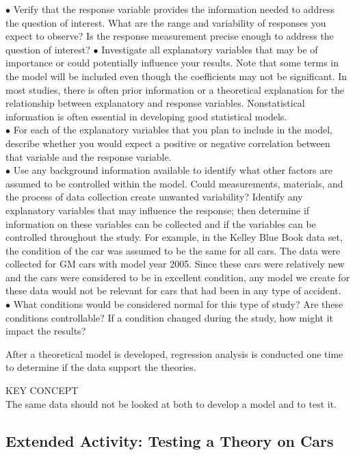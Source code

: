 \documentclass[
]{report}
\begin{document}
\(\bullet\) Verify that the response variable provides the information needed to address the question of interest. What are the range and variability of responses you expect to observe? Is the response measurement precise enough to address the question of interest?
\(\bullet\) Investigate all explanatory variables that may be of importance or could potentially influence your results. Note that some terms in the model will be included even though the coefficients may not be significant. In most studies, there is often prior information or a theoretical explanation for the relationship between explanatory and response variables. Nonstatistical information is often essential in developing good statistical models.\\
\(\bullet\) For each of the explanatory variables that you plan to include in the model, describe whether you would expect a positive or negative correlation between that variable and the response variable.\\
\(\bullet\) Use any background information available to identify what other factors are assumed to be controlled within the model. Could measurements, materials, and the process of data collection create unwanted variability? Identify any explanatory variables that may influence the response; then determine if information on these variables can be collected and if the variables can be controlled throughout the study. For example, in the Kelley Blue Book data set, the condition of the car was assumed to be the same for all cars. The data were collected for GM cars with model year 2005. Since these cars were relatively new and the cars were considered to be in excellent condition, any model we create for these data would not be relevant for cars that had been in any type of accident.\\
\(\bullet\) What conditions would be considered normal for this type of study? Are these conditions controllable? If a condition changed during the study, how might it impact the results?

After a theoretical model is developed, regression analysis is conducted one time to determine if the data support the theories.

KEY CONCEPT\\
The same data should not be looked at both to develop a model and to test it.

\subsection*{Extended Activity: Testing a Theory on Cars}\label{extended-activity-testing-a-theory-on-cars}
\end{document}
